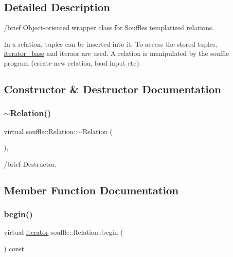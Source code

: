 \subsection{Detailed Description}
/brief Object-\/oriented wrapper class for Souffle\textquotesingle{}s templatized relations.

In a relation, tuples can be inserted into it. To access the stored tuples, \hyperlink{classsouffle_1_1_relation_1_1iterator__base}{iterator\+\_\+base} and iteraor are used. A relation is manipulated by the souffle program (create new relation, load input etc). 

\subsection{Constructor \& Destructor Documentation}
\mbox{\label{classsouffle_1_1_relation_aacc1e39d61e80905f92a20c6589776a4}} 
\subsubsection{\texorpdfstring{$\sim$\+Relation()}{~Relation()}}
{\footnotesize\ttfamily virtual souffle\+::\+Relation\+::$\sim$\+Relation (\begin{DoxyParamCaption}{ }\end{DoxyParamCaption})\hspace{0.3cm}{\ttfamily [virtual]}, {\ttfamily [default]}}

/brief Destructor. 

\subsection{Member Function Documentation}
\mbox{\label{classsouffle_1_1_relation_af6866f5c83061e31947ed2bd0f6d22e0}} 
\subsubsection{\texorpdfstring{begin()}{begin()}}
{\footnotesize\ttfamily virtual \hyperlink{classsouffle_1_1_relation_1_1iterator}{iterator} souffle\+::\+Relation\+::begin (\begin{DoxyParamCaption}{ }\end{DoxyParamCaption}) const\hspace{0.3cm}{\ttfamily [pure virtual]}}

